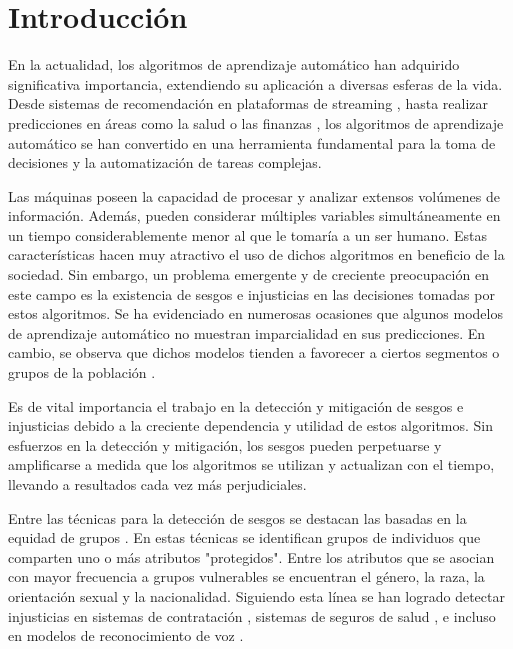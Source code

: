 \chapter*{Introducción}\label{chapter:introduction}

En la actualidad, los algoritmos de aprendizaje autom\'atico han adquirido significativa importancia, extendiendo su aplicaci\'on a diversas 
esferas de la vida. Desde sistemas de recomendaci\'on en plataformas de streaming \parencite{esmaeilzadeh2022abuse, bhattacharya2022augmenting},
hasta realizar predicciones en \'areas como la salud \parencite{roy2023machine} o las finanzas \parencite{sen2021machine}, los algoritmos de 
aprendizaje autom\'atico se han convertido en una herramienta fundamental para la toma de decisiones y la automatizaci\'on de tareas complejas.

Las m\'aquinas poseen la capacidad de procesar y analizar extensos vol\'umenes de informaci\'on. Adem\'as, pueden considerar m\'ultiples variables
simult\'aneamente en un tiempo considerablemente menor al que le tomar\'ia a un ser humano. Estas caracter\'isticas hacen muy atractivo el uso de
dichos algoritmos en beneficio de la sociedad. Sin embargo, un problema emergente y de creciente preocupaci\'on en este campo es la existencia de 
sesgos e injusticias en las decisiones tomadas por estos algoritmos. Se ha evidenciado en numerosas ocasiones que algunos modelos de aprendizaje 
autom\'atico no muestran imparcialidad en sus predicciones. En cambio, se observa que dichos modelos tienden a favorecer a ciertos segmentos 
o grupos de la poblaci\'on \parencite{survey}.
 
Es de vital importancia el trabajo en la detecci\'on y mitigaci\'on de sesgos e injusticias debido a la creciente dependencia y utilidad
de estos algoritmos. Sin esfuerzos en la detecci\'on y mitigaci\'on, los sesgos pueden perpetuarse y amplificarse a medida que los 
algoritmos se utilizan y actualizan con el tiempo, llevando a resultados cada vez m\'as perjudiciales. 

Entre las t\'ecnicas para la detecci\'on de sesgos se destacan las basadas en la equidad de grupos \parencite{fairmodels}. 
En estas t\'ecnicas se identifican grupos de individuos que comparten uno o m\'as atributos "protegidos". Entre los atributos que se asocian con 
mayor frecuencia a grupos vulnerables se encuentran el g\'enero, la raza, la orientaci\'on sexual y la nacionalidad. Siguiendo esta l\'inea se 
han logrado detectar injusticias en sistemas de contrataci\'on \parencite{examples_dis}, sistemas de seguros de salud 
\parencite{examples_dis}, e incluso en modelos de reconocimiento de voz \parencite{voice_bias}.

